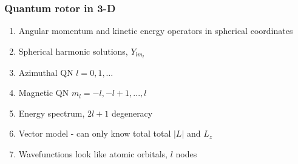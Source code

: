 \documentclass[11pt]{article}
\begin{document}
\subsubsection{Quantum rotor in 3-D}
\label{sec:org961c110}
\begin{enumerate}
\item Angular momentum and kinetic energy operators in spherical coordinates
\item Spherical harmonic solutions, \(Y_{lm_l}\)
\item Azimuthal QN \(l=0, 1, \ldots\)
\item Magnetic QN \(m_l = -l, -l+1, ..., l\)
\item Energy spectrum, \(2 l + 1\) degeneracy
\item Vector model - can only know total total \(|L|\) and \(L_z\)
\item Wavefunctions look like atomic orbitals, \(l\) nodes
\end{enumerate}
\end{document}
